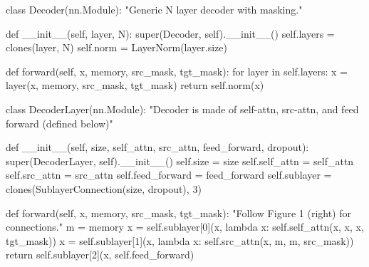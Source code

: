 \documentclass[
  letterpaper,
  DIV=11,
  numbers=noendperiod]{scrreprt}
\newenvironment{Shaded}{\begin{snugshade}}{\end{snugshade}}
\newcommand{\BuiltInTok}[1]{\textcolor[rgb]{0.00,0.23,0.31}{#1}}
\newcommand{\CommentTok}[1]{\textcolor[rgb]{0.37,0.37,0.37}{#1}}
\newcommand{\ControlFlowTok}[1]{\textcolor[rgb]{0.00,0.23,0.31}{#1}}
\newcommand{\DecValTok}[1]{\textcolor[rgb]{0.68,0.00,0.00}{#1}}
\newcommand{\FunctionTok}[1]{\textcolor[rgb]{0.28,0.35,0.67}{#1}}
\newcommand{\KeywordTok}[1]{\textcolor[rgb]{0.00,0.23,0.31}{#1}}
\newcommand{\NormalTok}[1]{\textcolor[rgb]{0.00,0.23,0.31}{#1}}
\newcommand{\OperatorTok}[1]{\textcolor[rgb]{0.37,0.37,0.37}{#1}}
\newcommand{\VariableTok}[1]{\textcolor[rgb]{0.07,0.07,0.07}{#1}}
\begin{document}
\begin{Shaded}
\begin{Highlighting}[]
\KeywordTok{class}\NormalTok{ Decoder(nn.Module):}
    \CommentTok{"Generic N layer decoder with masking."}

    \KeywordTok{def} \FunctionTok{\_\_init\_\_}\NormalTok{(}\VariableTok{self}\NormalTok{, layer, N):}
        \BuiltInTok{super}\NormalTok{(Decoder, }\VariableTok{self}\NormalTok{).}\FunctionTok{\_\_init\_\_}\NormalTok{()}
        \VariableTok{self}\NormalTok{.layers }\OperatorTok{=}\NormalTok{ clones(layer, N)}
        \VariableTok{self}\NormalTok{.norm }\OperatorTok{=}\NormalTok{ LayerNorm(layer.size)}

    \KeywordTok{def}\NormalTok{ forward(}\VariableTok{self}\NormalTok{, x, memory, src\_mask, tgt\_mask):}
        \ControlFlowTok{for}\NormalTok{ layer }\KeywordTok{in} \VariableTok{self}\NormalTok{.layers:}
\NormalTok{            x }\OperatorTok{=}\NormalTok{ layer(x, memory, src\_mask, tgt\_mask)}
        \ControlFlowTok{return} \VariableTok{self}\NormalTok{.norm(x)}
        
  
  \KeywordTok{class}\NormalTok{ DecoderLayer(nn.Module):}
    \CommentTok{"Decoder is made of self{-}attn, src{-}attn, and feed forward (defined below)"}

    \KeywordTok{def} \FunctionTok{\_\_init\_\_}\NormalTok{(}\VariableTok{self}\NormalTok{, size, self\_attn, src\_attn, feed\_forward, dropout):}
        \BuiltInTok{super}\NormalTok{(DecoderLayer, }\VariableTok{self}\NormalTok{).}\FunctionTok{\_\_init\_\_}\NormalTok{()}
        \VariableTok{self}\NormalTok{.size }\OperatorTok{=}\NormalTok{ size}
        \VariableTok{self}\NormalTok{.self\_attn }\OperatorTok{=}\NormalTok{ self\_attn}
        \VariableTok{self}\NormalTok{.src\_attn }\OperatorTok{=}\NormalTok{ src\_attn}
        \VariableTok{self}\NormalTok{.feed\_forward }\OperatorTok{=}\NormalTok{ feed\_forward}
        \VariableTok{self}\NormalTok{.sublayer }\OperatorTok{=}\NormalTok{ clones(SublayerConnection(size, dropout), }\DecValTok{3}\NormalTok{)}

    \KeywordTok{def}\NormalTok{ forward(}\VariableTok{self}\NormalTok{, x, memory, src\_mask, tgt\_mask):}
        \CommentTok{"Follow Figure 1 (right) for connections."}
\NormalTok{        m }\OperatorTok{=}\NormalTok{ memory}
\NormalTok{        x }\OperatorTok{=} \VariableTok{self}\NormalTok{.sublayer[}\DecValTok{0}\NormalTok{](x, }\KeywordTok{lambda}\NormalTok{ x: }\VariableTok{self}\NormalTok{.self\_attn(x, x, x, tgt\_mask))}
\NormalTok{        x }\OperatorTok{=} \VariableTok{self}\NormalTok{.sublayer[}\DecValTok{1}\NormalTok{](x, }\KeywordTok{lambda}\NormalTok{ x: }\VariableTok{self}\NormalTok{.src\_attn(x, m, m, src\_mask))}
        \ControlFlowTok{return} \VariableTok{self}\NormalTok{.sublayer[}\DecValTok{2}\NormalTok{](x, }\VariableTok{self}\NormalTok{.feed\_forward)}
        

\end{Highlighting}
\end{Shaded}
\end{document}
